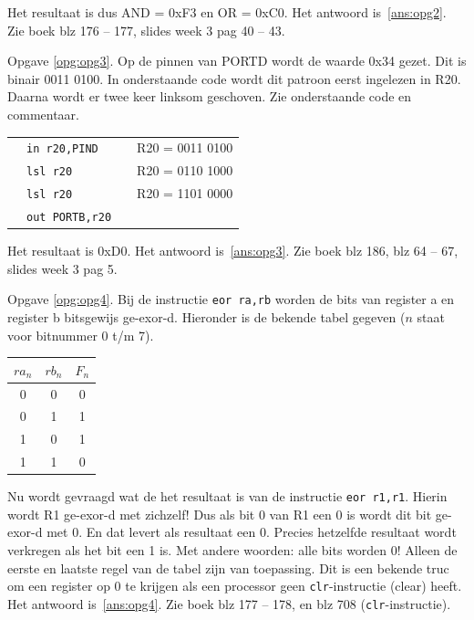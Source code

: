 \documentclass[a4paper,12pt,fleqn,dutch,mimicwordtwentyten]{tisdexam}
\begin{document}
\begin{questions}
Het resultaat is dus AND = 0xF3 en OR = 0xC0. Het antwoord is~\ref{ans:opg2}.
Zie boek blz 176 -- 177, slides week 3 pag 40 -- 43.
 
\vspace{1em}
Opgave \ref{opg:opg3}.\label{sol:opg3}
Op de pinnen van PORTD wordt de waarde 0x34 gezet. Dit is binair 0011 0100.
In onderstaande code wordt dit patroon eerst ingelezen in R20. Daarna wordt
er twee keer linksom geschoven. Zie onderstaande code en commentaar.

\begin{table}[h!]
	\begin{tabular}{l l l l}
		 & \texttt{in  r20,PIND}   &  &  R20 = 0011 0100  \\ 
	 	 & \texttt{lsl r20}        &  &  R20 = 0110 1000  \\ 
		 & \texttt{lsl r20}        &  &  R20 = 1101 0000  \\ 
		 & \texttt{out PORTB,r20}  &  &   \\
	\end{tabular} 
\end{table}

Het resultaat is 0xD0. Het antwoord is~\ref{ans:opg3}. Zie boek blz 186,
blz 64 -- 67, slides week 3 pag 5.

\vspace{1em}
Opgave \ref{opg:opg4}.\label{sol:opg4}
Bij  de instructie \texttt{eor ra,rb} worden de bits van register a en
register b bitsgewijs ge-exor-d. Hieronder is de bekende tabel gegeven
($n$ staat voor bitnummer 0 t/m 7).

\begin{table}[h!]
	\begin{tabular}{c c | c}
		\hline
		 $ra_{n}$ & $rb_{n}$ &  $F_{n}$  \\ \hline
		    0     &    0     &    0      \\ 
		    0     &    1     &    1      \\
		    1     &    0     &    1      \\
		    1     &    1     &    0      \\ \hline
	\end{tabular} 
\end{table}
			
Nu wordt gevraagd wat de het resultaat is van de instructie \texttt{eor r1,r1}.
Hierin wordt R1 ge-exor-d met zichzelf! Dus als bit 0 van R1 een 0 is wordt dit
bit ge-exor-d met 0. En dat levert als resultaat een 0. Precies hetzelfde
resultaat wordt verkregen als het bit een 1 is. Met andere woorden: alle bits
worden 0! Alleen de eerste en laatste regel van de tabel zijn van toepassing.
Dit is een bekende truc om een register op 0 te krijgen als een processor geen
\texttt{clr}-instructie (clear) heeft. Het antwoord is~\ref{ans:opg4}. Zie
boek blz 177 -- 178, en blz 708 (\texttt{clr}-instructie).


\end{questions}
\end{document}
